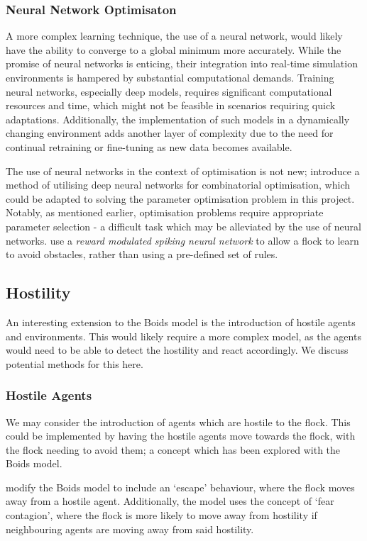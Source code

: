 \documentclass[12pt]{article}
\begin{document}
\subsubsection{Neural Network Optimisaton}
A more complex learning technique, the use of a neural network, would likely have the ability to converge to a global minimum more accurately. While the promise of neural networks is enticing, their integration into real-time simulation environments is hampered by substantial computational demands. Training neural networks, especially deep models, requires significant computational resources and time, which might not be feasible in scenarios requiring quick adaptations. Additionally, the implementation of such models in a dynamically changing environment adds another layer of complexity due to the need for continual retraining or fine-tuning as new data becomes available.

The use of neural networks in the context of optimisation is not new; \citet{Caldwell} introduce a method of utilising deep neural networks for combinatorial optimisation, which could be adapted to solving the parameter optimisation problem in this project. Notably, as mentioned earlier, optimisation problems require appropriate parameter selection - a difficult task which may be alleviated by the use of neural networks. \citet{zhao2022nature} use a \emph{reward modulated spiking neural network} to allow a flock to learn to avoid obstacles, rather than using a pre-defined set of rules.

\subsection{Hostility}
An interesting extension to the Boids model is the introduction of hostile agents and environments. This would likely require a more complex model, as the agents would need to be able to detect the hostility and react accordingly. We discuss potential methods for this here.

\subsubsection{Hostile Agents}
We may consider the introduction of agents which are hostile to the flock. This could be implemented by having the hostile agents move towards the flock, with the flock needing to avoid them; a concept which has been explored with the Boids model\cite{chen2008application}.

\citet{delgado2007use} modify the Boids model to include an `escape' behaviour, where the flock moves away from a hostile agent. Additionally, the model uses the concept of `fear contagion', where the flock is more likely to move away from hostility if neighbouring agents are moving away from said hostility. 
\end{document}
